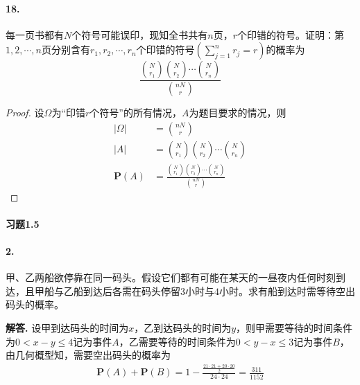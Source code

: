 \documentclass[12pt, a4paper, oneside]{ctexart}
\newenvironment{solution}{\par\noindent\textbf{解答. }}{\bigskip\par}
\begin{document}
\paragraph{18.}每一页书都有$N$个符号可能误印，现知全书共有$n$页，$r$个印错的符号。证明：第$1,2,\cdots,n$页分别含有$r_1,r_2,\cdots,r_n$个印错的符号$\left(\sum_{j=1}^nr_j=r\right)$的概率为
\begin{equation*}
    \frac{\binom{N}{r_1}\binom{N}{r_2}\cdots\binom{N}{r_n}}{\binom{nN}{r}}
\end{equation*}
\begin{proof}
    设$\Omega$为“印错$r$个符号”的所有情况，$A$为题目要求的情况，则
    \begin{equation*}
        \begin{aligned}
            |\Omega| &= \binom{nN}{r}\\
            |A| &= \binom{N}{r_1}\binom{N}{r_2}\cdots\binom{N}{r_n}\\
            \textbf{P}(A) &= \frac{\binom{N}{r_1}\binom{N}{r_2}\cdots\binom{N}{r_n}}{\binom{nN}{r}}
        \end{aligned}
    \end{equation*}
\end{proof}
\paragraph{习题1.5}
\paragraph{2.}甲、乙两船欲停靠在同一码头。假设它们都有可能在某天的一昼夜内任何时刻到达，且甲船与乙船到达后各需在码头停留$3$小时与$4$小时。求有船到达时需等待空出码头的概率。
\begin{solution}
    设甲到达码头的时间为$x$，乙到达码头的时间为$y$，则甲需要等待的时间条件为$0<x-y\leqslant 4$记为事件$A$，乙需要等待的时间条件为$0<y-x\leqslant 3$记为事件$B$，由几何概型知，需要空出码头的概率为
    \begin{equation*}
        \begin{aligned}
            \textbf{P}(A)+\textbf{P}(B) = 1-\frac{\frac{21\cdot21+20\cdot20}{2}}{24\cdot24} = \frac{311}{1152}
        \end{aligned}
    \end{equation*}
\end{solution}
\end{document}
